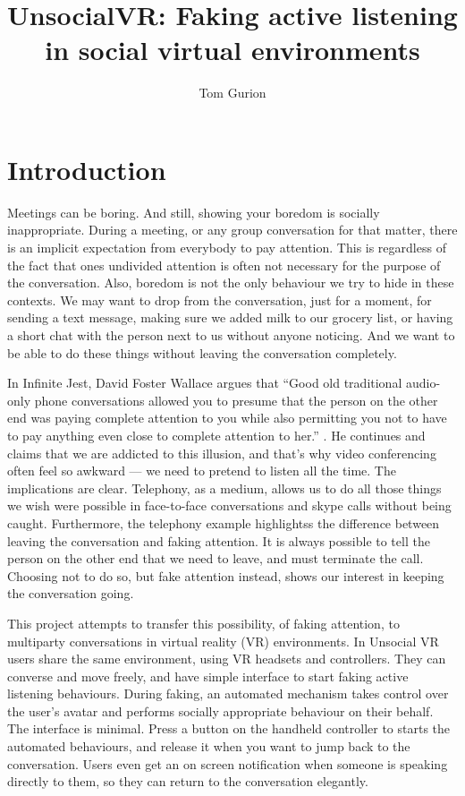 \documentclass[]{simple-thesis}
\title{UnsocialVR: Faking active listening in social virtual environments}
\author{Tom Gurion}
\affiliation{Media and Arts Technology\\Queen Mary University of London}
\begin{document}
\frontmatter{}  %


\setcounter{page}{1}  %
\chapter{Introduction}

Meetings can be boring.
And still, showing your boredom is socially inappropriate.
During a meeting, or any group conversation for that matter, there is an implicit expectation from everybody to pay attention.
This is regardless of the fact that ones undivided attention is often not necessary for the purpose of the conversation.
Also, boredom is not the only behaviour we try to hide in these contexts.
We may want to drop from the conversation, just for a moment, for sending a text message, making sure we added milk to our grocery list, or having a short chat with the person next to us without anyone noticing.
And we want to be able to do these things without leaving the conversation completely.

In Infinite Jest, David Foster Wallace argues that ``Good old traditional audio-only phone conversations allowed you to presume that the person on the other end was paying complete attention to you while also permitting you not to have to pay anything even close to complete attention to her.'' \citep{Wallace1996}.
He continues and claims that we are addicted to this illusion, and that's why video conferencing often feel so awkward --- we need to pretend to listen all the time.
The implications are clear.
Telephony, as a medium, allows us to do all those things we wish were possible in face-to-face conversations and skype calls without being caught.
Furthermore, the telephony example highlightss the difference between leaving the conversation and faking attention.
It is always possible to tell the person on the other end that we need to leave, and must terminate the call.
Choosing not to do so, but fake attention instead, shows our interest in keeping the conversation going.

This project attempts to transfer this possibility, of faking attention, to multiparty conversations in virtual reality (VR) environments.
In Unsocial VR users share the same environment, using VR headsets and controllers.
They can converse and move freely, and have simple interface to start faking active listening behaviours.
During faking, an automated mechanism takes control over the user's avatar and performs socially appropriate behaviour on their behalf.
The interface is minimal.
Press a button on the handheld controller to starts the automated behaviours, and release it when you want to jump back to the conversation.
Users even get an on screen notification when someone is speaking directly to them, so they can return to the conversation elegantly.
\end{document}
